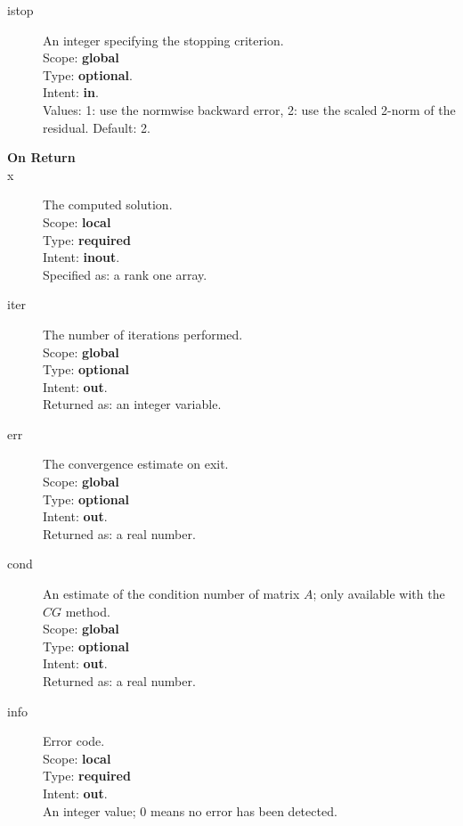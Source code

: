 \begin{description}
\item[istop]  An integer specifying the stopping criterion.\\
Scope: {\bf global} \\
Type: {\bf optional}.\\
Intent: {\bf in}.\\
Values: 1: use the normwise backward error, 2: use the scaled 2-norm
of the residual. Default: 2. 
\item[\bf On Return] 
\item[x] The computed solution. \\
Scope: {\bf local} \\
Type: {\bf required}\\
Intent: {\bf inout}.\\
Specified as: a rank one array.
\item[iter]  The number of iterations performed.\\
Scope: {\bf global} \\
Type: {\bf optional}\\
Intent: {\bf out}.\\
Returned  as: an integer variable.
\item[err]  The convergence estimate on exit.\\
Scope: {\bf global} \\
Type: {\bf optional}\\
Intent: {\bf out}.\\
Returned  as: a real number.
\item[cond]  An estimate of the condition number of matrix $A$; only
  available with the $CG$ method.\\
Scope: {\bf global} \\
Type: {\bf optional}\\
Intent: {\bf out}.\\
Returned  as: a real number.
\item[info] Error code.\\
Scope: {\bf local} \\
Type: {\bf required} \\
Intent: {\bf out}.\\
An integer value; 0 means no error has been detected. 
\end{description}



